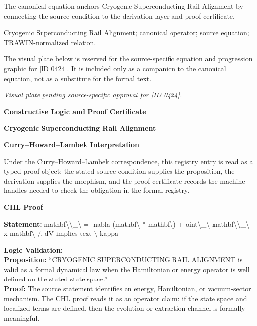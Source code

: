 The canonical equation anchors Cryogenic Superconducting Rail Alignment by connecting the source condition to the derivation layer and proof certificate.

Cryogenic Superconducting Rail Alignment; canonical operator; source equation; TRAWIN-normalized relation.
\endgroup

\begingroup\footnotesize\sloppy
The visual plate below is reserved for the source-specific equation and progression graphic for [ID 0424]. It is included only as a companion to the canonical equation, not as a substitute for the formal text.
\par\endgroup
\begingroup\footnotesize\itshape
Visual plate pending source-specific approval for [ID 0424].
\par\endgroup

\clearpage
\begingroup\tzpsupportsetup
\noindent\textbf{\fontsize{10.8pt}{12.8pt}\selectfont [ID 0424] Constructive Logic and Proof Certificate}\par
\noindent\textbf{\fontsize{10pt}{12pt}\selectfont Cryogenic Superconducting Rail Alignment}\par
\vspace{0.45em}
\begingroup
\footnotesize
\setlength{\parskip}{0.22em}
\setlength{\parindent}{0pt}
\noindent\textbf{Curry--Howard--Lambek Interpretation}\par
Under the Curry--Howard--Lambek correspondence, this registry entry is read as a typed proof
object: the stated source condition supplies the proposition, the derivation supplies the
morphism, and the proof certificate records the machine handles needed to check the obligation
in the formal registry.

\vspace{0.45em}
\noindent\textbf{CHL Proof}\par
\textbf{Statement:} mathbf\textbackslash{}\textbackslash{}\_\textbackslash{} = -nabla (mathbf\textbackslash{} * mathbf\textbackslash{}) + oint\textbackslash{}\_\textbackslash{} mathbf\textbackslash{}\textbackslash{}\_\textbackslash{} x mathbf\textbackslash{} /, dV implies
text \textbackslash{} kappa

\textbf{Logic Validation:}\\
\textbf{Proposition:} ``CRYOGENIC SUPERCONDUCTING RAIL ALIGNMENT is valid as a formal dynamical law when the
Hamiltonian or energy operator is well defined on the stated state space.''\\
\textbf{Proof:} The source statement identifies an energy, Hamiltonian, or vacuum-sector mechanism. The
CHL proof reads it as an operator claim: if the state space and localized terms are
defined, then the evolution or extraction channel is formally meaningful.

